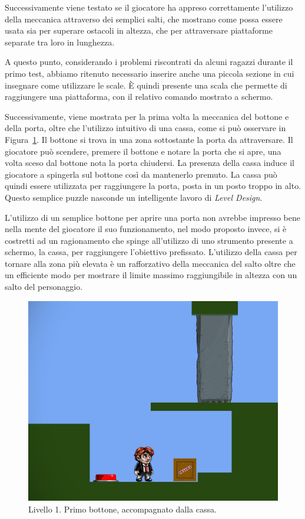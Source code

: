 Successivamente viene testato se il giocatore ha appreso correttamente l’utilizzo della meccanica attraverso dei semplici salti, che mostrano come possa essere usata sia per superare ostacoli in altezza, che per attraversare piattaforme separate tra loro in lunghezza.

A questo punto, considerando i problemi riscontrati da alcuni ragazzi durante il primo test, abbiamo ritenuto necessario inserire anche una piccola sezione in cui insegnare come utilizzare le scale. È quindi presente una scala che permette di raggiungere una piattaforma, con il relativo comando mostrato a schermo.

Successivamente, viene mostrata per la prima volta la meccanica del bottone e della porta, oltre che l’utilizzo intuitivo di una cassa, come si può osservare in Figura~\ref{fig:livello1_bottone}. Il bottone si trova in una zona sottostante la porta da attraversare. Il giocatore può scendere, premere il bottone e notare la porta che si apre, una volta sceso dal bottone nota la porta chiudersi. La presenza della cassa induce il giocatore a spingerla sul bottone così da mantenerlo premuto. La cassa può quindi essere utilizzata per raggiungere la porta, posta in un posto troppo in alto. Questo semplice puzzle nasconde un intelligente lavoro di \textit{Level Design}. 

L’utilizzo di un semplice bottone per aprire una porta non avrebbe impresso bene nella mente del giocatore il suo funzionamento, nel modo proposto invece, si è costretti ad un ragionamento che spinge all’utilizzo di uno strumento presente a schermo, la cassa, per raggiungere l’obiettivo prefissato. L’utilizzo della cassa per tornare alla zona più elevata è un rafforzativo della meccanica del salto oltre che un efficiente modo per mostrare il limite massimo raggiungibile in altezza con un salto del personaggio.

\begin{figure}%
	\centering
	\includegraphics[width= 0.65\columnwidth]{images/gameDesign/42_bottone.jpg}
	\caption{Livello 1. Primo bottone, accompagnato dalla cassa.}
	\label{fig:livello1_bottone}
\end{figure}

